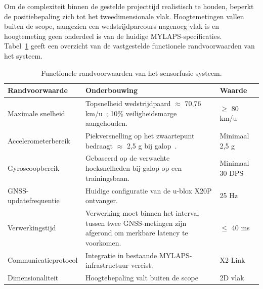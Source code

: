 Om de complexiteit binnen de gestelde projecttijd realistisch te houden, 
beperkt de positiebepaling zich tot het tweedimensionale vlak. 
Hoogtemetingen vallen buiten de scope, aangezien een wedstrijdparcours 
nagenoeg vlak is en hoogtemeting geen onderdeel is van de huidige 
MYLAPS-specificaties. \\

Tabel~\ref{tab:randvoorwaarden} geeft een overzicht van de vastgestelde 
functionele randvoorwaarden van het systeem.

\begin{table}[htbp]
    \centering
    \caption{Functionele randvoorwaarden van het sensorfusie systeem.}
    \label{tab:randvoorwaarden}
    \renewcommand{\arraystretch}{1.3}
    \begin{tabularx}{\textwidth}{|l|X|l|}
        \hline
        \rowcolor{green!20}
        \textbf{Randvoorwaarde} & \textbf{Onderbouwing} & \textbf{Waarde} \\ 
        \hline

        Maximale snelheid &
        Topsnelheid wedstrijdpaard $\approx$ 70,76 km/u~\cite{jockeyclub_racehorses}; 
        10\% veiligheidsmarge aangehouden. &
        $\geq$ 80 km/u \\ \hline

        Accelerometerbereik &
        Piekversnelling op het zwaartepunt bedraagt $\approx$ 2,5 g bij 
        galop~\cite{witte2006effect}. &
        Minimaal 2,5 g \\ \hline

        Gyroscoopbereik &
        Gebaseerd op de verwachte hoeksnelheden bij galop op een 
        trainingsbaan. &
        Minimaal 30 DPS \\ \hline

        GNSS-updatefrequentie &
        Huidige configuratie van de u-blox X20P ontvanger. &
        25 Hz \\ \hline

        Verwerkingstijd &
        Verwerking moet binnen het interval tussen twee GNSS-metingen 
        zijn afgerond om merkbare latency te voorkomen. &
        $\leq$ 40 ms \\ \hline

        Communicatieprotocol &
        Integratie in bestaande MYLAPS-infrastructuur vereist. &
        X2 Link \\ \hline

        Dimensionaliteit &
        Hoogtebepaling valt buiten de scope &
        2D vlak \\ \hline

    \end{tabularx}
\end{table}

